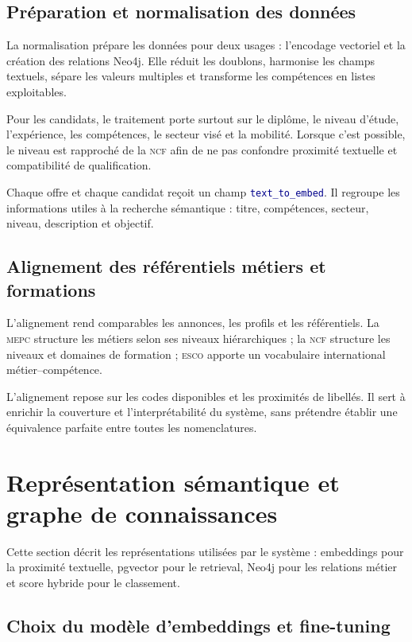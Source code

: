 \documentclass[12pt,twoside]{report}
\newcommand{\filevar}[1]{\texttt{\textcolor{darkblue}{#1}}}
\newcommand{\ESCO}{\textsc{esco}}
\newcommand{\MEPC}{\textsc{mepc}}
\newcommand{\NCF}{\textsc{ncf}}
\begin{document}
\subsection{Préparation et normalisation des données}

La normalisation prépare les données pour deux usages : l'encodage vectoriel et la création des relations Neo4j. Elle réduit les doublons, harmonise les champs textuels, sépare les valeurs multiples et transforme les compétences en listes exploitables.

Pour les candidats, le traitement porte surtout sur le diplôme, le niveau d'étude, l'expérience, les compétences, le secteur visé et la mobilité. Lorsque c'est possible, le niveau est rapproché de la \NCF{} afin de ne pas confondre proximité textuelle et compatibilité de qualification.

Chaque offre et chaque candidat reçoit un champ \filevar{text\_to\_embed}. Il regroupe les informations utiles à la recherche sémantique : titre, compétences, secteur, niveau, description et objectif.

\subsection{Alignement des référentiels métiers et formations}

L'alignement rend comparables les annonces, les profils et les référentiels. La \MEPC{} structure les métiers selon ses niveaux hiérarchiques ; la \NCF{} structure les niveaux et domaines de formation ; \ESCO{} apporte un vocabulaire international métier--compétence.

L'alignement repose sur les codes disponibles et les proximités de libellés. Il sert à enrichir la couverture et l'interprétabilité du système, sans prétendre établir une équivalence parfaite entre toutes les nomenclatures.

\section{Représentation sémantique et graphe de connaissances}
Cette section décrit les représentations utilisées par le système : embeddings pour la proximité textuelle, pgvector pour le retrieval, Neo4j pour les relations métier et score hybride pour le classement.

\subsection{Choix du modèle d'embeddings et fine-tuning}
\end{document}

